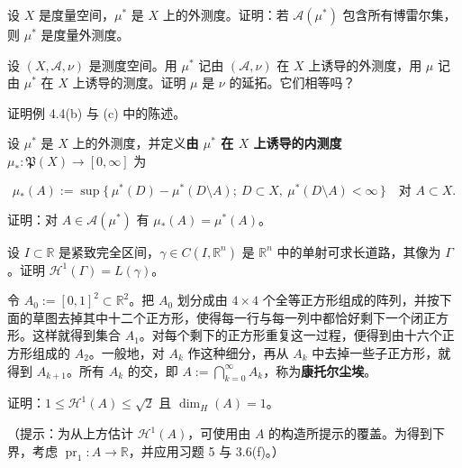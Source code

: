 \exerciseshead

\begin{exercises}
\item

设 $ X $ 是度量空间，$ \mu^{*} $ 是 $ X $ 上的外测度。证明：若 $ \mathcal{A}(\mu^{*}) $ 包含所有博雷尔集，则 $ \mu^{*} $ 是度量外测度。

\item

设 $ (X, \mathcal{A}, \nu) $ 是测度空间。用 $ \mu^{*} $ 记由 $ (\mathcal{A}, \nu) $ 在 $ X $ 上诱导的外测度，用 $ \mu $ 记由 $ \mu^{*} $ 在 $ X $ 上诱导的测度。证明 $ \mu $ 是 $ \nu $ 的延拓。它们相等吗？

\item

证明例 4.4(b) 与 (c) 中的陈述。

\item

设 $ \mu^{*} $ 是 $ X $ 上的外测度，并定义\textbf{由 $ \mu^{*} $ 在 $ X $ 上诱导的内测度} $ \mu_{*}\colon \mathfrak{P}(X) \to [0, \infty] $ 为

\[
\mu_{*}(A) := \sup\{\, \mu^{*}(D) - \mu^{*}(D \setminus A) ;\ D \subset X,\ \mu^{*}(D \setminus A) < \infty \,\} \quad \text{对 } A \subset X .
\]

证明：对 $ A \in \mathcal{A}(\mu^{*}) $ 有 $ \mu_{*}(A) = \mu^{*}(A) $。

\item

设 $ I \subset \mathbb{R} $ 是紧致完全区间，$ \gamma \in C(I, \mathbb{R}^{n}) $ 是 $ \mathbb{R}^{n} $ 中的单射可求长道路，其像为 $ \Gamma $。证明 $ \mathcal{H}^{1}(\Gamma) = L(\gamma) $。

\item

令 $ A_{0} := [0, 1]^{2} \subset \mathbb{R}^{2} $。把 $ A_{0} $ 划分成由 $ 4 \times 4 $ 个全等正方形组成的阵列，并按下面的草图去掉其中十二个正方形，使得每一行与每一列中都恰好剩下一个闭正方形。这样就得到集合 $ A_{1} $。对每个剩下的正方形重复这一过程，便得到由十六个正方形组成的 $ A_{2} $。一般地，对 $ A_{k} $ 作这种细分，再从 $ A_{k} $ 中去掉一些子正方形，就得到 $ A_{k+1} $。所有 $ A_{k} $ 的交，即 $ A := \bigcap_{k=0}^{\infty} A_{k} $，称为\textbf{康托尔尘埃}。

证明：$ 1 \le \mathcal{H}^{1}(A) \le \sqrt{2} $ 且 $ \dim_H(A) = 1 $。


（提示：为从上方估计 $ \mathcal{H}^{1}(A) $，可使用由 $ A $ 的构造所提示的覆盖。为得到下界，考虑 $ \operatorname{pr}_{1}\colon A \to \mathbb{R} $，并应用习题 5 与 3.6(f)。）


\end{exercises}
